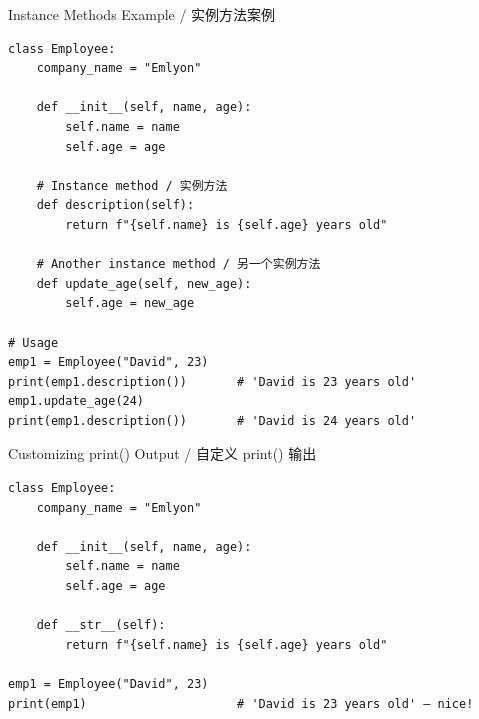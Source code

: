 \documentclass[11pt,a4paper]{report}
\begin{document}
\begin{examplebox}{Instance Methods Example / 实例方法案例}
\begin{lstlisting}
class Employee:
    company_name = "Emlyon"

    def __init__(self, name, age):
        self.name = name
        self.age = age

    # Instance method / 实例方法
    def description(self):
        return f"{self.name} is {self.age} years old"

    # Another instance method / 另一个实例方法
    def update_age(self, new_age):
        self.age = new_age

# Usage
emp1 = Employee("David", 23)
print(emp1.description())       # 'David is 23 years old'
emp1.update_age(24)
print(emp1.description())       # 'David is 24 years old'
\end{lstlisting}
\end{examplebox}

\begin{examplebox}{Customizing print() Output / 自定义 print() 输出}
\begin{lstlisting}
class Employee:
    company_name = "Emlyon"

    def __init__(self, name, age):
        self.name = name
        self.age = age

    def __str__(self):
        return f"{self.name} is {self.age} years old"

emp1 = Employee("David", 23)
print(emp1)                     # 'David is 23 years old' — nice!
\end{lstlisting}
\end{examplebox}
\end{document}
